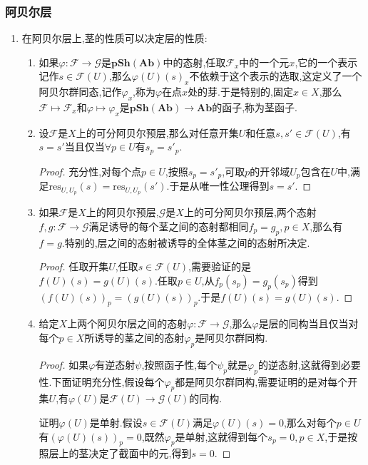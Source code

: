 \subsubsection{阿贝尔层}
\begin{enumerate}
	\item 在阿贝尔层上,茎的性质可以决定层的性质:
	\begin{enumerate}[(1)]
		\item 如果$\varphi:\mathscr{F}\to\mathscr{G}$是$\textbf{pSh}(\textbf{Ab})$中的态射,任取$\mathscr{F}_x$中的一个元$x$,它的一个表示记作$s\in\mathscr{F}(U)$,那么$\varphi(U)(s)_x$不依赖于这个表示的选取,这定义了一个阿贝尔群同态,记作$\varphi_x$,称为$\varphi$在点$x$处的芽.于是特别的,固定$x\in X$,那么$\mathscr{F}\mapsto\mathscr{F}_x$和$\varphi\mapsto\varphi_x$是$\textbf{pSh}(\textbf{Ab})\to\textbf{Ab}$的函子,称为茎函子.
		\item 设$\mathscr{F}$是$X$上的可分阿贝尔预层,那么对任意开集$U$和任意$s,s'\in \mathscr{F}(U)$,有$s=s'$当且仅当$\forall p\in U$有$s_p=s'_p$.
		\begin{proof}
			
			充分性,对每个点$p\in U$,按照$s_p=s'_p$,可取$p$的开邻域$U_p$包含在$U$中,满足$\mathrm{res}_{U,U_p}(s)=\mathrm{res}_{U,U_p}(s')$.于是从唯一性公理得到$s=s'$.
		\end{proof}
		\item 如果$\mathscr{F}$是$X$上的阿贝尔预层,$\mathscr{G}$是$X$上的可分阿贝尔预层,两个态射$f,g:\mathscr{F}\to\mathscr{G}$满足诱导的每个茎之间的态射都相同$f_p=g_p,p\in X$,那么有$f=g$.特别的,层之间的态射被诱导的全体茎之间的态射所决定.
		\begin{proof}
			
			任取开集$U$,任取$s\in\mathscr{F}(U)$,需要验证的是$f(U)(s)=g(U)(s)$.任取$p\in U$,从$f_p(s_p)=g_p(s_p)$得到$(f(U)(s))_p=(g(U)(s))_p$.于是$f(U)(s)=g(U)(s)$.
		\end{proof}
		\item 给定$X$上两个阿贝尔层之间的态射$\varphi:\mathscr{F}\to\mathscr{G}$,那么$\varphi$是层的同构当且仅当对每个$p\in X$所诱导的茎之间的态射$\varphi_p$是阿贝尔群同构.
		\begin{proof}
			
			如果$\varphi$有逆态射$\psi$,按照函子性,每个$\psi_p$就是$\varphi_p$的逆态射,这就得到必要性.下面证明充分性,假设每个$\varphi_p$都是阿贝尔群同构,需要证明的是对每个开集$U$,有$\varphi(U)$是$\mathscr{F}(U)\to\mathscr{G}(U)$的同构.
			
			证明$\varphi(U)$是单射.假设$s\in\mathscr{F}(U)$满足$\varphi(U)(s)=0$,那么对每个$p\in U$有$(\varphi(U)(s))_p=0$,既然$\varphi_p$是单射,这就得到每个$s_p=0,p\in X$,于是按照层上的茎决定了截面中的元,得到$s=0$.
			

\end{proof}
\end{enumerate}
\end{enumerate}
